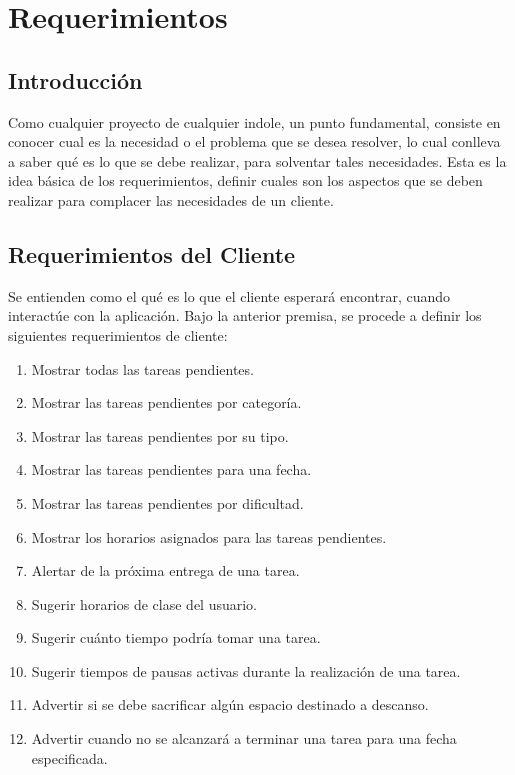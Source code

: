 
\chapter{Requerimientos}
\section{Introducción}
Como cualquier proyecto de cualquier indole, un punto fundamental, consiste en conocer cual es la necesidad o el problema que se desea resolver, lo cual conlleva a saber qué es lo que se debe realizar, para solventar tales necesidades. Esta es la idea básica de los requerimientos, definir cuales son los aspectos que se deben realizar para complacer las necesidades de un cliente.
\newpage

\section{Requerimientos del Cliente}
Se entienden como el qué es lo que el cliente esperará encontrar, cuando interactúe con la aplicación. Bajo la anterior premisa, se procede a definir los siguientes requerimientos de cliente:

\begin{enumerate}
	\item Mostrar todas las tareas pendientes.
	\item Mostrar las tareas pendientes por categoría.
	\item Mostrar las tareas pendientes por su tipo.
	\item Mostrar las tareas pendientes para una fecha.
	\item Mostrar las tareas pendientes por dificultad.
	\item Mostrar los horarios asignados para las tareas pendientes.
	\item Alertar de la próxima entrega de una tarea.
	\item Sugerir horarios de clase del usuario.
	\item Sugerir cuánto tiempo podría tomar una tarea.
	\item Sugerir tiempos de pausas activas durante la realización de una tarea.
	\item Advertir si se debe sacrificar algún espacio destinado a descanso.
	\item Advertir cuando no se alcanzará a terminar una tarea para una fecha especificada.
\end{enumerate}



